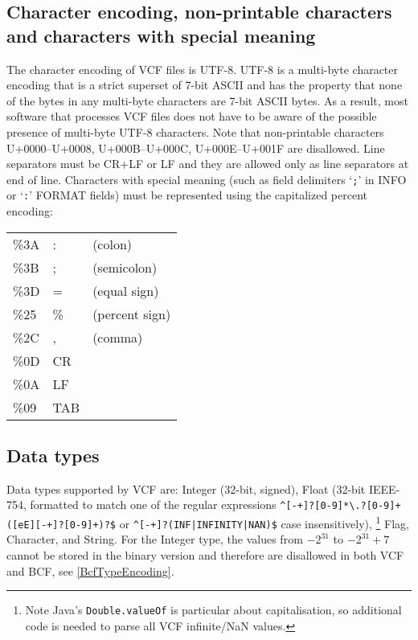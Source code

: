 \documentclass[8pt]{article}
\begin{document}
\subsection{Character encoding, non-printable characters and characters with special meaning}
\label{character-encoding}
The character encoding of VCF files is UTF-8.
UTF-8 is a multi-byte character encoding that is a strict superset of 7-bit ASCII and has the property that none of the bytes in any multi-byte characters are 7-bit ASCII bytes.
As a result, most software that processes VCF files does not have to be aware of the possible presence of multi-byte UTF-8 characters.
Note that non-printable characters U+0000--U+0008, U+000B--U+000C, U+000E--U+001F are disallowed.
Line separators must be CR+LF or LF and they are allowed only as line separators at end of line.
Characters with special meaning (such as field delimiters `\verb|;|' in INFO or `\verb|:|' FORMAT fields) must be represented using the capitalized percent encoding:

\begingroup\footnotesize
\begin{tabular}{l l l}
\%3A  &  :  & (colon)                \\
\%3B  &  ;  & (semicolon)            \\
\%3D  &  =  & (equal sign)           \\
\%25  &  \% & (percent sign)         \\
\%2C  &  ,  & (comma)                \\
\%0D  & CR  &                        \\
\%0A  & LF  &                        \\
\%09  & TAB & 
\end{tabular}
\endgroup


\subsection{Data types}
Data types supported by VCF are: Integer (32-bit, signed), Float (32-bit IEEE-754, formatted to match one of the regular expressions \verb|^[-+]?[0-9]*\.?[0-9]+([eE][-+]?[0-9]+)?$| or \verb"^[-+]?(INF|INFINITY|NAN)$" case insensitively),%
\footnote{Note Java's {\tt Double.valueOf} is particular about capitalisation, so additional code is needed to parse all VCF infinite/NaN values.}
Flag, Character, and String.
For the Integer type, the values from $-2^{31}$ to $-2^{31}+7$ cannot be stored in the binary version and therefore are disallowed in both VCF and BCF, see \ref{BcfTypeEncoding}.
\end{document}
